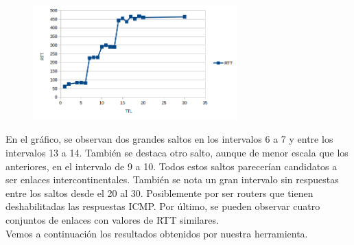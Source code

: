 \FloatBarrier

\begin{figure}[ht!]
  \centering
   \includegraphics[width=0.7\textwidth]{imagenes/CHI.png}
\end{figure}

\FloatBarrier

En el gráfico, se observan dos grandes saltos en los intervalos 6 a 7 y entre los intervalos 13 a 14. También se destaca otro salto, aunque de menor escala que los anteriores, en el intervalo de 9 a 10. Todos estos saltos parecerían candidatos a ser enlaces intercontinentales.
También se nota un gran intervalo sin respuestas entre los saltos desde el 20 al 30. Posiblemente por ser routers que tienen deshabilitadas las respuestas ICMP.
Por último, se  pueden observar cuatro conjuntos de enlaces con valores de RTT similares.
\\
Vemos a continuación los resultados obtenidos por nuestra herramienta.


